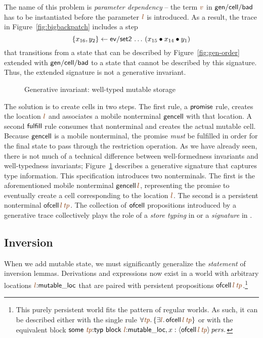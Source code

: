 The name of this problem is {\it parameter dependency} -- the term
$\lf{v}$ in ${\sf gen/cell/bad}$ has to be instantiated before the
parameter $\lf{l}$ is introduced. As a result, the trace in
Figure~\ref{fig:bigbackpatch} includes a step
\[\{{x_{16},y_2}\} \leftarrow {{\sf
    ev/set2}\,\ldots\,({x_{15}} \mathbin{\bullet}{{x_{14}} \mathbin{\bullet}{y_1}})}\] that
transitions from a state that can be described by
Figure~\ref{fig:gen-order} extended with ${\sf gen/cell/bad}$ to a
state that cannot be described by this signature. Thus, the extended
signature is not a generative invariant.

\begin{figure}[t]
\caption{Generative invariant: well-typed mutable storage}
\label{fig:gen-state} 
\end{figure}

The solution is to create cells in two steps. The first rule, a ${\sf
  promise}$ rule, creates the location $\lf{l}$ and associates a mobile
nonterminal ${\sf gencell}$ with that location. A second ${\sf
  fulfill}$ rule consumes that nonterminal and creates the actual
mutable cell.  Because ${\sf gencell}$ is a mobile nonterminal, the
promise {\it must} be fulfilled in order for the final state to pass
through the restriction operation. As we have already seen,
there is not much of a technical difference between well-formedness
invariants and well-typedness invariants; Figure~\ref{fig:gen-state}
describes a generative signature that captures type information. 
This specification introduces
two nonterminals. The first is the aforementioned mobile nonterminal
${\sf gencell}\,\lf{l}$, representing the promise to
eventually create a cell corresponding to the location $\lf{l}$.  
The second is a
persistent nonterminal ${\sf ofcell}\,\lf{l}\,\lf{\it tp}$. The
collection of ${\sf ofcell}$ propositions introduced by a generative
trace collectively plays the role of a {\it store typing} in
\cite[Chapter 13]{pierce02types} or a {\it signature} in \cite[Chapter
35]{harper12practical}.

\subsection{Inversion}

When we add mutable state, we must significantly generalize the 
{\it statement} of inversion lemmas. Derivations and
expressions now exist in a world with arbitrary locations $\lf{l}{:}{\sf
  mutable\_loc}$ that are paired with persistent propositions
${{\sf ofcell}\,\lf{l}\,\lf{\it tp}}$.\footnote{This purely persistent
world fits the pattern of regular worlds. 
As such, it can be described either with the
single rule
$\forall \lf{\it tp}.\,\{ \exists \lf{l}.\,{\sf
    ofcell}\,\lf{l}\,\lf{\it tp}\}$ or with the equivalent block
${\sf some} ~ \lf{\it tp}{:}{\sf
  typ} ~ {\sf block} ~ \lf{l}{:}{\sf mutable\_loc}, x : \ispers{\susp{{\sf
    ofcell}\,\lf{l}\,\lf{\it tp}}}.$}

